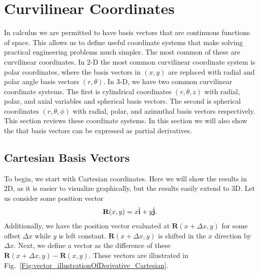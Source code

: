 \section{Curvilinear Coordinates}

In calculus we are permitted to have basis vectors that are continuous functions of space. This allows us to define useful coordinate systems that make solving practical engineering problems much simpler. The most common of these are curvilinear coordinates. In 2-D the most common curvilinear coordinate system is polar coordinates, where the basis vectors in $(x,y)$ are replaced with radial and polar angle basis vectors $(r,\theta)$. In 3-D, we have two common curvilinear coordinate systems. The first is cylindrical coordinates $(r,\theta,z)$ with radial, polar, and axial variables and spherical basis vectors. The second is spherical coordinates $(r,\theta,\phi)$ with radial, polar, and azimuthal basis vectors respectively. This section reviews these coordinate systems. In this section we will also show the that basis vectors can be expressed as partial derivatives.


\subsection{Cartesian Basis Vectors}

To begin, we start with Cartesian coordinates. Here we will show the results in 2D, as it is easier to visualize graphically, but the results easily extend to 3D. Let us consider some position vector
\begin{align}
  \mathbf{R}(x,y) = x \hat{\mathbf{i}} + y \hat{\mathbf{j}} .
\end{align}
Additionally, we have the position vector evaluated at $\mathbf{R}(x + \Delta x, y)$ for some offset $\Delta x$ while $y$ is left constant. $\mathbf{R}(x + \Delta x, y)$ is shifted in the $x$ direction by $\Delta x$. Next, we define a vector as the difference of these $\mathbf{R}(x + \Delta x, y) - \mathbf{R}(x,y)$. These vectors are illustrated in Fig.~\ref{Fig:vector_illustrationOfDerivative_Cartesian}.

